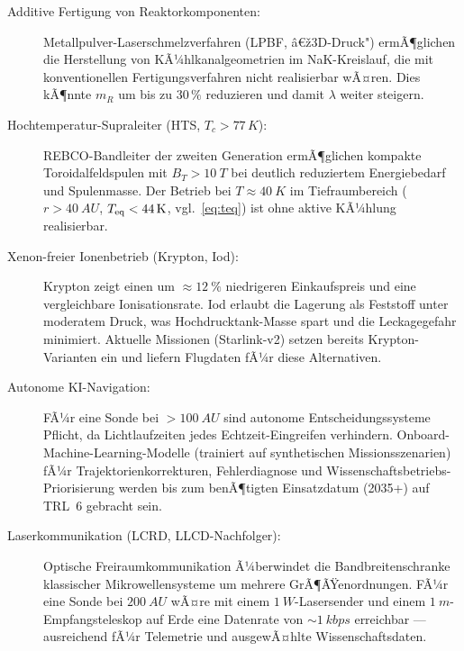 ﻿\documentclass[a4paper,12pt,twoside]{article}
\theoremstyle{plain}
\theoremstyle{definition}
\theoremstyle{remark}
\begin{document}
	\begin{description}
		\item[Additive Fertigung von Reaktorkomponenten:]
		Metallpulver-Laserschmelzverfahren (LPBF, â€ž3D-Druck") ermÃ¶glichen
		die Herstellung von KÃ¼hlkanalgeometrien im NaK-Kreislauf, die mit
		konventionellen Fertigungsverfahren nicht realisierbar wÃ¤ren.
		Dies kÃ¶nnte $m_R$ um bis zu $30\,\%$ reduzieren und damit $\lambda$
		weiter steigern.

		\item[Hochtemperatur-Supraleiter (HTS, $T_c > 77\,\si{K}$):]
		REBCO-Bandleiter der zweiten Generation ermÃ¶glichen kompakte
		Toroidalfeldspulen mit $B_T > \SI{10}{T}$ bei deutlich reduziertem
		Energiebedarf und Spulenmasse. Der Betrieb bei $T \approx \SI{40}{K}$
		im Tiefraumbereich ($r > \SI{40}{AU}$, $T_{\rm eq} < \SI{44}{K}$,
		vgl.\ \cref{eq:teq}) ist ohne aktive KÃ¼hlung realisierbar.

		\item[Xenon-freier Ionenbetrieb (Krypton, Iod):]
		Krypton zeigt einen um $\approx\SI{12}{\%}$ niedrigeren Einkaufspreis
		und eine vergleichbare Ionisationsrate. Iod erlaubt die Lagerung als
		Feststoff unter moderatem Druck, was Hochdrucktank-Masse spart und die
		Leckagegefahr minimiert. Aktuelle Missionen (Starlink-v2) setzen bereits
		Krypton-Varianten ein und liefern Flugdaten fÃ¼r diese Alternativen.

		\item[Autonome KI-Navigation:]
		FÃ¼r eine Sonde bei $>\SI{100}{AU}$ sind autonome Entscheidungssysteme
		Pflicht, da Lichtlaufzeiten jedes Echtzeit-Eingreifen verhindern.
		Onboard-Machine-Learning-Modelle (trainiert auf synthetischen
		Missionsszenarien) fÃ¼r Trajektorienkorrekturen, Fehlerdiagnose und
		Wissenschaftsbetriebs-Priorisierung werden bis zum benÃ¶tigten
		Einsatzdatum (2035+) auf TRL~6 gebracht sein.

		\item[Laserkommuni\-kation (LCRD, LLCD-Nachfolger):]
		Optische Freiraumkommunikation Ã¼berwindet die Bandbreitenschranke
		klassischer Mikrowellensysteme um mehrere GrÃ¶ÃŸenordnungen. FÃ¼r
		eine Sonde bei $\SI{200}{AU}$ wÃ¤re mit einem $\SI{1}{W}$-Lasersender
		und einem $\SI{1}{m}$-Empfangsteleskop auf Erde eine Datenrate von
		$\sim\SI{1}{kbps}$ erreichbar --- ausreichend fÃ¼r Telemetrie und
		ausgewÃ¤hlte Wissenschaftsdaten.
	\end{description}

\end{document}
